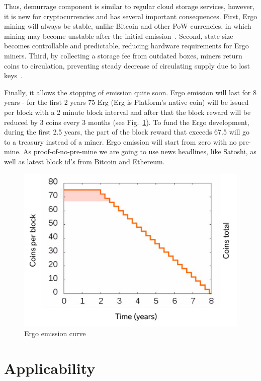 \documentclass[]{article}
\begin{document}
    Thus, demurrage component is similar to regular cloud storage services, however, it is new for
    cryptocurrencies and has several important consequences. First, Ergo mining will always be
    stable, unlike Bitcoin and other PoW currencies, in which mining may become unstable after the
    initial emission~\cite{carlsten2016instability}. Second, state size becomes controllable and predictable, reducing
    hardware requirements for Ergo miners. Third, by collecting a storage fee from outdated boxes,
    miners return coins to circulation, preventing steady decrease of circulating supply due to lost
    keys~\cite{wsj2018}.

    Finally, it allows the stopping of emission quite soon. Ergo emission will last for 8 years - for the
    first 2 years 75 Erg (Erg is Platform's native coin) will be issued per block with a 2 minute block
    interval and after that the block reward will be reduced by 3 coins every 3 months (see Fig.~\ref{fig:emission}).
    To fund the Ergo development, during the first 2.5 years, the part of the block reward that
    exceeds 67.5 will go to a treasury instead of a miner. Ergo emission will start from zero with no
    pre-mine. As proof-of-no-pre-mine we are going to use news headlines, like Satoshi, as well as
    latest block id's from Bitcoin and Ethereum.

    \begin{figure}[h]
        \centering
        \includegraphics[width=\textwidth]{emission.jpg}
        \caption{Ergo emission curve
        \label{fig:emission} }
    \end{figure}


    \section{Applicability}
\end{document}
